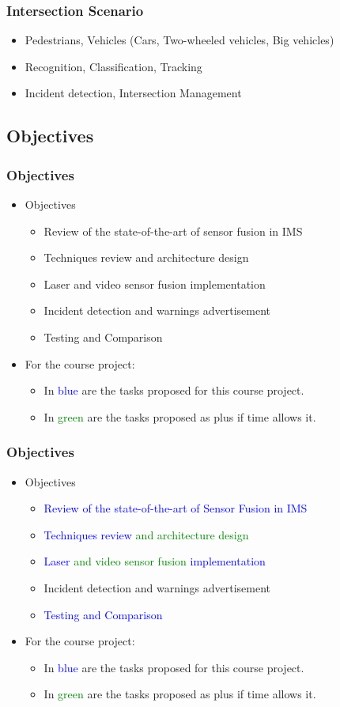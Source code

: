 \documentclass{beamer}
\begin{document}
\frame
{
	\frametitle{Intersection Scenario}
	\begin{itemize}
		\item Pedestrians, Vehicles (Cars, Two-wheeled vehicles, Big vehicles)
		\item Recognition, Classification, Tracking
		\item Incident detection, Intersection Management
	\end{itemize}
}
\subsection{Objectives}

\frame
{
	\frametitle{Objectives}
	\begin{itemize}
	\item Objectives
		\begin{itemize}
			\item Review of the state-of-the-art of sensor fusion in IMS
			\item Techniques review and architecture design 
			\item Laser and video sensor fusion implementation
			\item Incident detection and warnings advertisement
			\item Testing and Comparison
		\end{itemize}
	\item<2-> For the course project:
		\begin{itemize}
			\item<2-> In \textcolor{blue}{blue} are the tasks proposed for this course project.
			\item<2-> In \textcolor{green}{green} are the tasks proposed as plus if time allows it.
		\end{itemize}
	\end{itemize}
}
\frame
{
	\frametitle{Objectives}
	\begin{itemize}
	\item Objectives
		\begin{itemize}
			\item \textcolor{blue}{Review of the state-of-the-art of Sensor Fusion in IMS}
			\item \textcolor{blue}{Techniques review} \textcolor{green}{and architecture design}
			\item \textcolor{blue}{Laser} \textcolor{green}{and video sensor fusion} \textcolor{blue}{implementation}
			\item Incident detection and warnings advertisement
			\item \textcolor{blue}{Testing and Comparison}
		\end{itemize}
	\item For the course project:
		\begin{itemize}
			\item In \textcolor{blue}{blue} are the tasks proposed for this course project.
			\item In \textcolor{green}{green} are the tasks proposed as plus if time allows it.
		\end{itemize}
	\end{itemize}
}
\end{document}
